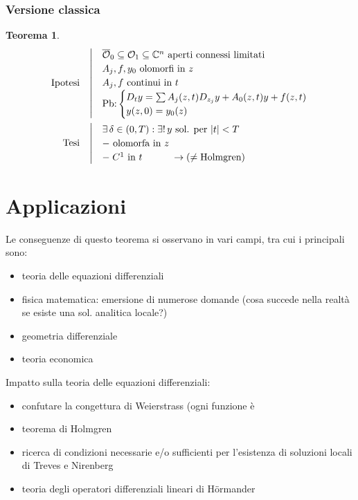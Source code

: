 \documentclass[serif,notheorems]{beamer}
\makeatletter
\newenvironment{ipotesi}%
{\quad\left|\quad\def\arraystretch{1.2}\begin{array}{@{}l@{}}}%
{\end{array}\right.}
\newcommand{\hpth}[2]
{
\begin{align*}
\quad
\text{Ipotesi}
&\begin{ipotesi}
#1
\end{ipotesi}\\
\text{Tesi}
&\begin{ipotesi}
#2
\end{ipotesi}
\end{align*}
}
\theoremstyle{definition} %
\newtheorem{theorem}{Teorema}[section] %
\theoremstyle{remark}
\makeatother
\begin{document}
\begin{frame}
\frametitle{Versione classica}
\begin{theorem}
\vspace{-5mm}
\hpth{
\overline{\mathcal{O}}_0 \subseteq \mathcal{O}_1 \subseteq \mathbb{C}^n \text{ aperti connessi limitati}\\
A_j, f, y_0 \text{ olomorfi in } z\\
A_j, f \text{ continui in } t\\
\text{Pb:}
\begin{cases}
D_t y = \sum A_j (z,t) D_{z_j}y+A_0(z,t)y +f(z,t) \\
y(z,0)=y_0(z)
\end{cases}\\
}{
\exists \, \delta \in (0,T) : \exists !\, y \text{ sol. per } |t|<T \\
- \text{ olomorfa in } z\\
- \; C^1 \text{ in } t \quad \quad \quad \rightarrow (\neq \text{Holmgren})
}
\end{theorem}
\end{frame}


\section{Applicazioni}

\begin{frame}
Le conseguenze di questo teorema si osservano in vari campi, tra cui i principali sono:
\begin{itemize}
\item teoria delle equazioni differenziali
\item fisica matematica: emersione di numerose domande (cosa succede nella realtà se esiste una sol. analitica locale?)
\item geometria differenziale
\item teoria economica
\end{itemize}
\end{frame}

\begin{frame}
Impatto sulla teoria delle equazioni differenziali:
\begin{itemize}
\item confutare la congettura di Weierstrass (ogni funzione è 
\item teorema di Holmgren
\item ricerca di condizioni necessarie e/o sufficienti per l'esistenza di soluzioni locali di Treves e Nirenberg
\item teoria degli operatori differenziali lineari di Hörmander
\end{itemize}
\end{frame}
\end{document}
